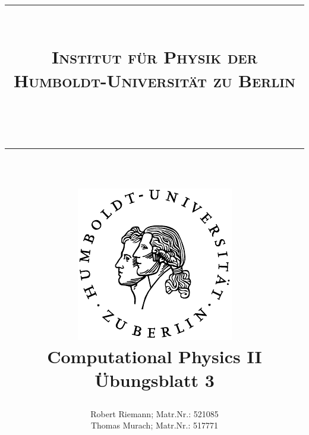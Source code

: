 \documentclass[a4paper,oneside,bibtotoc,smallheadings,pointlessnumbers,
halfparskip,DIV15]{scrartcl}
\newcommand{\lref}[1]{Listing (\ref{lst:#1})} %
\newcommand{\eref}[1]{Gl. (\ref{eqn:#1})} %
\begin{document}
\title{{\centering \rule{15cm}{0.001cm}\\
\Large{\textsc{Institut für Physik der
Humboldt-Universität zu Berlin}}}\\ \centering \rule{15cm}{0.001cm}\\
\vspace{15mm} \centering
\includegraphics[scale=0.9]{../../assets/siegel}\\
\vspace{18mm}
{\bf{\huge{Computational Physics II}}}\\
\vspace{12mm}
Übungsblatt 3\\
\vspace{15mm}
}
\author{Robert Riemann; Matr.Nr.: 521085\\
Thomas Murach; Matr.Nr.: 517771\vspace{18mm}}
\maketitle

\newpage

% 
% 
% 
% 
% 
% 

%
%
% 
%
%
\end{document}
